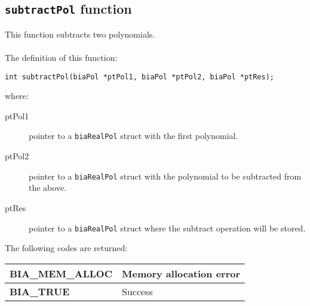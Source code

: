 \subsection{\texttt{subtractPol} function}

This function subtracts two polynomials.\\ \\
%
The definition of this function:
%
\begin{verbatim}
int subtractPol(biaPol *ptPol1, biaPol *ptPol2, biaPol *ptRes);
\end{verbatim}
%
where:
%
\begin{description}
\item[ptPol1] pointer to a \texttt{biaRealPol} struct with the first polynomial.
\item[ptPol2] pointer to a \texttt{biaRealPol} struct with the polynomial to be subtracted from the above.
\item[ptRes] pointer to a \texttt{biaRealPol} struct where the subtract operation will be stored.
\end{description}
%
The following codes are returned:
%
\begin{center}
\begin{tabular}{|l|l|}
\hline
\textbf{BIA\_MEM\_ALLOC} & Memory allocation error \\
\hline
\textbf{BIA\_TRUE} & Success \\
\hline
\end{tabular}
\end{center}
%
%




